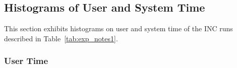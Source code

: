 \subsection{Histograms of User and System Time~\label{sec:u_s_time_hist}} 
This section exhibits histograms on user and system time of the INC runs described in Table~\ref{tab:exp_notes1}. 

\subsubsection{User Time}

\begin{figure}[hp!]
	\centering
\end{figure}
